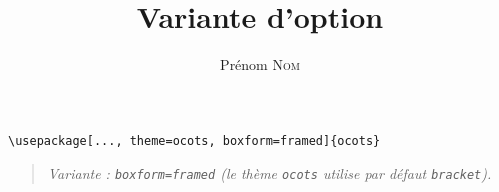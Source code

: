 \documentclass[11pt]{ocots-book}
\title{Variante d'option}
\author{Prénom \textsc{Nom}}
\newcommand{\ocotsvariantnote}[1]{\begin{quote}\itshape Variante : #1\end{quote}}
\begin{document}
\maketitle

\begin{lstlisting}
\usepackage[..., theme=ocots, boxform=framed]{ocots}
\end{lstlisting}
\ocotsvariantnote{\texttt{boxform=framed} (le th\`eme \texttt{ocots} utilise par d\'efaut \texttt{bracket}).}

\end{document}
